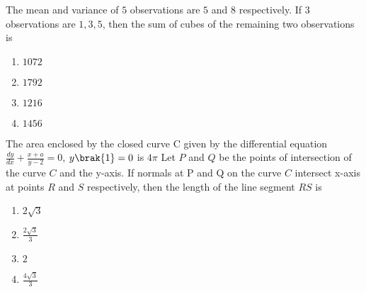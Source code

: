 \hfill{}
\item The mean and variance of $5$ observations are $5$ and 
$8$ respectively. If $3$ observations are $1, 3, 5$, then 
the sum of cubes of the remaining two 
observations is
\begin{enumerate}
    \item $1072$
    \item $1792$
    \item $1216$
    \item $1456$
\end{enumerate}
\hfill{}
\item The area enclosed by the closed curve C given by 
the differential equation 
$\frac{dy}{dx}+\frac{x+a}{y-2}=0$, $y\brak{1}=0$ is $4\pi$
 Let $P$ and $Q$ be the points of intersection of the 
curve $C$ and the y-axis. If normals at P and Q on 
the curve $C$ intersect x-axis at points $R$ and $S$ 
respectively, then the length of the line segment 
$RS$ is
\begin{enumerate}
    \item $2\sqrt{3}$
    \item $\frac{2\sqrt{3}}{3}$
    \item $2$
    \item $\frac{4\sqrt{3}}{3}$
\end{enumerate}
\hfill{}
